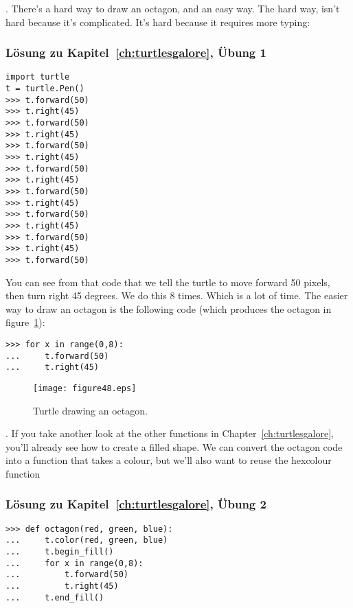 . There's a hard way to draw an octagon, and an easy way.  The hard way, isn't hard because it's complicated.  It's hard because it requires more typing:
\subsubsection{Lösung zu Kapitel~\ref{ch:turtlesgalore}, Übung 1}

\begin{Verbatim}[frame=single]
import turtle
t = turtle.Pen()
>>> t.forward(50)
>>> t.right(45)
>>> t.forward(50)
>>> t.right(45)
>>> t.forward(50)
>>> t.right(45)
>>> t.forward(50)
>>> t.right(45)
>>> t.forward(50)
>>> t.right(45)
>>> t.forward(50)
>>> t.right(45)
>>> t.forward(50)
>>> t.right(45)
>>> t.forward(50)
\end{Verbatim}

\noindent
You can see from that code that we tell the turtle to move forward 50 pixels, then turn right 45 degrees.  We do this 8 times.  Which is a lot of time.  The easier way to draw an octagon is the following code (which produces the octagon in figure~\ref{fig48}):

\begin{Verbatim}[frame=single]
>>> for x in range(0,8):
...     t.forward(50)
...     t.right(45)
\end{Verbatim}

\begin{figure}
\begin{center}
\texttt{[image: figure48.eps]}
\end{center}
\caption{Turtle drawing an octagon.}\label{fig48}
\end{figure}

.  If you take another look at the other functions in Chapter~\ref{ch:turtlesgalore}, you'll already see how to create a filled shape. We can convert the octagon code into a function that takes a colour, but we'll also want to reuse the hexcolour function
\subsubsection{Lösung zu Kapitel~\ref{ch:turtlesgalore}, Übung 2}

\begin{Verbatim}[frame=single]
>>> def octagon(red, green, blue):
...     t.color(red, green, blue)
...     t.begin_fill()
...     for x in range(0,8):
...         t.forward(50)
...         t.right(45)
...     t.end_fill()
\end{Verbatim}

